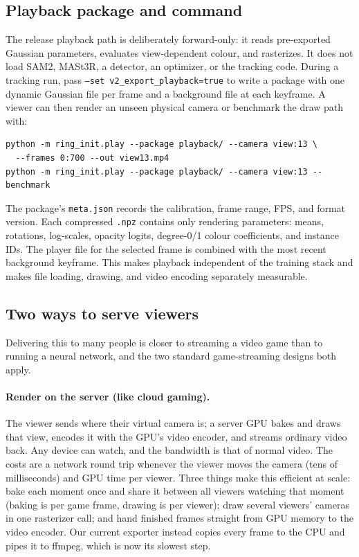 \documentclass[11pt]{article}
\begin{document}
\subsection{Playback package and command}
The release playback path is deliberately forward-only: it reads pre-exported Gaussian parameters,
evaluates view-dependent colour, and rasterizes. It does not load SAM2, MASt3R, a detector, an
optimizer, or the tracking code. During a tracking run, pass
\texttt{--set v2\_export\_playback=true} to write a package with one dynamic Gaussian file per
frame and a background file at each keyframe. A viewer
can then render an unseen physical camera or benchmark the draw path with:
\begin{verbatim}
python -m ring_init.play --package playback/ --camera view:13 \
  --frames 0:700 --out view13.mp4
python -m ring_init.play --package playback/ --camera view:13 --benchmark
\end{verbatim}
The package's \texttt{meta.json} records the calibration, frame range, FPS, and format version.
Each compressed \texttt{.npz} contains only rendering parameters: means, rotations, log-scales,
opacity logits, degree-0/1 colour coefficients, and instance IDs. The player file for the selected
frame is combined with the most recent background keyframe. This makes playback independent of the
training stack and makes file loading, drawing, and video encoding separately measurable.

\subsection{Two ways to serve viewers}
Delivering this to many people is closer to streaming a video game than to running a neural
network, and the two standard game-streaming designs both apply.
\paragraph{Render on the server (like cloud gaming).} The viewer sends where their virtual camera
is; a server GPU bakes and draws that view, encodes it with the GPU's video encoder, and streams
ordinary video back. Any device can watch, and the bandwidth is that of normal video. The costs are
a network round trip whenever the viewer moves the camera (tens of milliseconds) and GPU time per
viewer. Three things make this efficient at scale: bake each moment once and share it between all
viewers watching that moment (baking is per game frame, drawing is per viewer); draw several
viewers' cameras in one rasterizer call; and hand finished frames straight from GPU memory to the
video encoder. Our current exporter instead copies every frame to the CPU and pipes it to ffmpeg,
which is now its slowest step.
\end{document}
